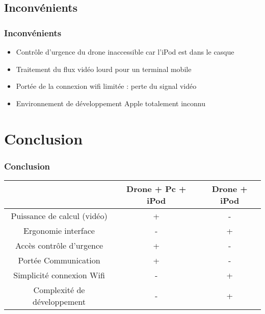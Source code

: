\documentclass[11pt]{beamer}
\begin{document}

\subsection{Inconvénients}
\begin{frame}
\frametitle{Inconvénients}

\begin{itemize}
    \item Contrôle d'urgence du drone inaccessible car l'iPod est dans le casque%
    
    \item Traitement du flux vidéo lourd pour un terminal mobile%
    \item Portée de la connexion wifi limitée : perte du signal vidéo 
    \item Environnement de développement Apple totalement inconnu
        
  \end{itemize}
\end{frame}


\section{Conclusion}
\begin{frame}
\frametitle{Conclusion}
\begin{center}
\hspace{-0.5cm}
\begin{tabular}{|c|c|c|}
\hline
 & Drone + Pc + iPod & Drone + iPod \\
 \hline
 Puissance de calcul (vidéo)& + & - \\
 \hline
 Ergonomie interface & - & +\\
 \hline
 Accès contrôle d'urgence & + & -\\
 \hline
 Portée Communication & + & -\\
 \hline
 Simplicité connexion Wifi & - & +\\
 \hline
 Complexité de développement & - & +\\
 \hline
 
\end{tabular}
\end{center}
\end{frame}

\end{document}
